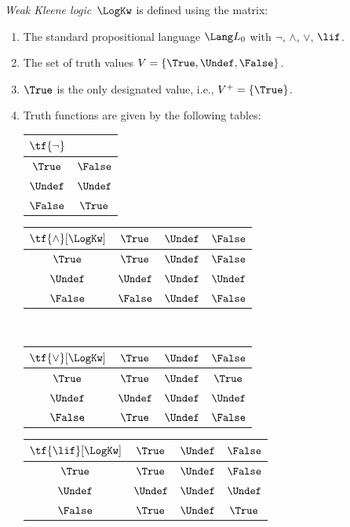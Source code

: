 \documentclass[../../../../include/open-logic-chapter]{subfiles}
\begin{document}
\begin{defn}
\emph{Weak Kleene logic}~$\LogKw$ is defined using the matrix:
\begin{enumerate}
  \item The standard propositional language $\Lang L_0$ with
  $\lnot$, $\land$, $\lor$, $\lif$.
  \item The set of truth values $V = \{\True, \Undef, \False\}$.
  \item $\True$ is the only designated value, i.e., $V^+ = \{\True\}$.
  \item Truth functions are given by the following tables:
  \begin{center}
    \begin{tabular}{c|c} 
      $\tf{\lnot}$ & \\ 
      \hline  
      $\True$ & $\False$ \\ 
      $\Undef$ & $\Undef$ \\
      $\False$ & $\True$ 
    \end{tabular}
    \quad
    \begin{tabular}{c|ccc} 
      $\tf{\land}[\LogKw]$ & $\True$ & $\Undef$ & $\False$ \\ 
      \hline 
      $\True$ & $\True$ & $\Undef$ & $\False$ \\ 
      $\Undef$ & $\Undef$ & $\Undef$ & $\Undef$\\ 
      $\False$ & $\False$ & $\Undef$ & $\False$ 
    \end{tabular}
    \\[2ex]
    \begin{tabular}{c|ccc} 
      $\tf{\lor}[\LogKw]$ & $\True$ & $\Undef$ & $\False$ \\ 
      \hline 
      $\True$ & $\True$ & $\Undef$ & $\True$ \\ 
      $\Undef$ & $\Undef$ & $\Undef$ & $\Undef$ \\
      $\False$ & $\True$ & $\Undef$ & $\False$ 
    \end{tabular}
    \quad
    \begin{tabular}{c|ccc} 
      $\tf{\lif}[\LogKw]$ & $\True$ & $\Undef$ & $\False$ \\ 
      \hline 
      $\True$ & $\True$ & $\Undef$ & $\False$ \\ 
      $\Undef$ & $\Undef$ & $\Undef$ & $\Undef$  \\ 
      $\False$ & $\True$ & $\Undef$ & $\True$ 
    \end{tabular}
  \end{center} 
\end{enumerate}
\end{defn}
\end{document}
